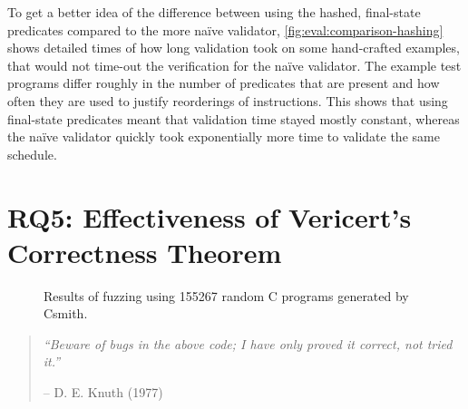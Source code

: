 To get a better idea of the difference between using the hashed, final-state
predicates compared to the more naïve validator,
\cref{fig:eval:comparison-hashing} shows detailed times of how long validation
took on some hand-crafted examples, that would not time-out the verification for
the naïve validator.  The example test programs differ roughly in the number of
predicates that are present and how often they are used to justify reorderings
of instructions.  This shows that using final-state predicates meant that
validation time stayed mostly constant, whereas the naïve validator quickly took
exponentially more time to validate the same schedule.

\section{RQ5: Effectiveness of Vericert's Correctness Theorem}

\begin{figure}
  \centering

  \caption{Results of fuzzing \vericert{} using 155267 random C programs generated by Csmith.}\label{tab:fuzzing}
\end{figure}

\begin{quotation}
  \textit{\enquote{Beware of bugs in the above code; I have only proved it
      correct, not tried it.}}\par\hfill -- D. E. Knuth (1977)
\end{quotation}

